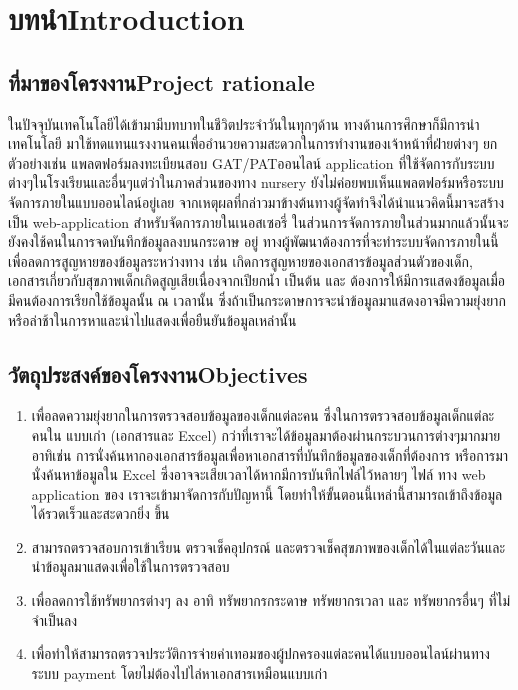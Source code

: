 \chapter{\ifcpe บทนำ\else Introduction\fi}

\section{\ifcpe ที่มาของโครงงาน\else Project rationale\fi}

ในปัจจุบันเทคโนโลยีได้เข้ามามีบทบาทในชีวิตประจําวันในทุกๆด้าน ทางด้านการศึกษาก็มีการนําเทคโนโลยี มาใช้ทดแทนแรงงานคนเพื่ออํานวยความสะดวกในการทํางานของเจ้าหน้าที่ฝ่ายต่างๆ ยกตัวอย่างเช่น แพลตฟอร์มลงทะเบียนสอบ GAT/PATออนไลน์ application ที่ใช้จัดการกับระบบต่างๆในโรงเรียนและอื่นๆแต่ว่าในภาคส่วนของทาง nursery ยังไม่ค่อยพบเห็นแพลตฟอร์มหรือระบบจัดการภายในแบบออนไลน์อยู่เลย จากเหตุผลที่กล่าวมาข้างต้นทางผู้จัดทําจึงได้นำแนวคิดนี้มาจะสร้างเป็น web-application 
สําหรับจัดการภายในเนอสเซอรี่ ในส่วนการจัดการภายในส่วนมากแล้วนั้นจะยังคงใช้คนในการจดบันทึกข้อมูลลงบนกระดาษ
อยู่ ทางผู้พัฒนาต้องการที่จะทําระบบจัดการภายในนี้เพื่อลดการสูญหายของข้อมูลระหว่างทาง เช่น เกิดการสูญหายของเอกสารข้อมูลส่วนตัวของเด็ก, เอกสารเกี่ยวกับสุขภาพเด็กเกิดสูญเสียเนื่องจากเปียกน้ำ เป็นต้น และ ต้องการให้มีการแสดงข้อมูลเมื่อมีคนต้องการเรียกใช้ข้อมูลนั้น ณ เวลานั้น   ซึ่งถ้าเป็นกระดาษการจะนําข้อมูลมาแสดงอาจมีความยุ่งยากหรือล่าช้าในการหาและนําไปแสดงเพื่อยืนยันข้อมูลเหล่านั้น 



\section{\ifcpe วัตถุประสงค์ของโครงงาน\else Objectives\fi}
\begin{enumerate}
    \item เพื่อลดความยุ่งยากในการตรวจสอบข้อมูลของเด็กแต่ละคน ซึ่งในการตรวจสอบข้อมูลเด็กแต่ละคนใน แบบเก่า (เอกสารและ Excel) กว่าที่เราจะได้ข้อมูลมาต้องผ่านกระบวนการต่างๆมากมาย อาทิเช่น การนั่งค้นหากองเอกสารข้อมูลเพื่อหาเอกสารที่บันทึกข้อมูลของเด็กที่ต้องการ หรือการมานั่งค้นหาข้อมูลใน Excel ซึ่งอาจจะเสียเวลาได้หากมีการบันทึกไฟล์ไว้หลายๆ ไฟล์ ทาง web application ของ เราจะเข้ามาจัดการกับปัญหานี้ โดยทําให้ขั้นตอนนี้เหล่านี้สามารถเข้าถึงข้อมูลได้รวดเร็วและสะดวกยิ่ง ขึ้น 

    \item สามารถตรวจสอบการเข้าเรียน ตรวจเช็คอุปกรณ์ และตรวจเช็คสุขภาพของเด็กได้ในแต่ละวันและนําข้อมูลมาแสดงเพื่อใช้ในการตรวจสอบ

    \item เพื่อลดการใช้ทรัพยากรต่างๆ ลง อาทิ ทรัพยากรกระดาษ ทรัพยากรเวลา และ ทรัพยากรอื่นๆ ที่ไม่จําเป็นลง
    \item เพื่อทำให้สามารถตรวจประวัติการจ่ายค่าเทอมของผู้ปกครองแต่ละคนได้แบบออนไลน์ผ่านทางระบบ payment โดยไม่ต้องไปไล่หาเอกสารเหมือนแบบเก่า

\end{enumerate}


